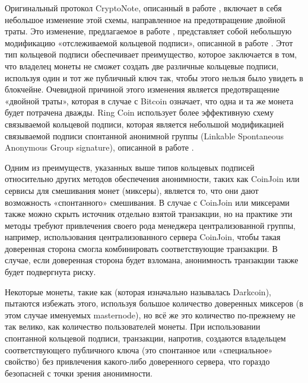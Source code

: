 \documentclass{mrl}
\theoremstyle{definition}
\numberwithin{thm}{section}
\begin{document}
Оригинальный протокол CryptoNote, описанный в работе \cite{CN}, включает в себя небольшое изменение этой схемы, направленное на предотвращение двойной траты. Это изменение, предлагаемое в работе \cite{CN}, представляет собой небольшую модификацию «отслеживаемой кольцевой подписи», описанной в работе \cite{FS}. Этот тип кольцевой подписи обеспечивает преимущество, которое заключается в том, что владелец монеты не сможет создать две различные кольцевые подписи, используя один и тот же публичный ключ так, чтобы этого нельзя было увидеть в блокчейне. Очевидной причиной этого изменения является предотвращение «двойной траты», которая в случае с Bitcoin означает, что одна и та же монета будет потрачена дважды. Ring Coin \cite{B2,B} использует более эффективную схему связываемой кольцевой подписи, которая является небольшой модификацией связываемой подписи спонтанной анонимной группы (Linkable Spontaneous Anonymous Group signature), описанной в работе \cite{LWW}.

Одним из преимуществ, указанных выше типов кольцевых подписей относительно других методов обеспечения анонимности, таких как CoinJoin \cite{GMc} или сервисы для смешивания монет (миксеры), является то, что они дают возможность «спонтанного» смешивания. В случае с CoinJoin или миксерами также можно скрыть источник отдельно взятой транзакции, но на практике эти методы требуют привлечения своего рода менеджера централизованной группы, например, использования централизованного сервера CoinJoin, чтобы такая доверенная сторона смогла комбинировать соответствующие транзакции. В случае, если доверенная сторона будет взломана, анонимность транзакции также будет подвергнута риску.

Некоторые монеты, такие как \cite{DASH} (которая изначально называлась Darkcoin), пытаются избежать этого, используя большое количество доверенных миксеров (в этом случае именуемых masternode), но всё же это количество по-прежнему не так велико, как количество пользователей монеты. При использовании спонтанной кольцевой подписи, транзакции, напротив, создаются владельцем соответствующего публичного ключа (это спонтанное или «специальное» свойство) без привлечения какого-либо доверенного сервера, что гораздо безопасней с точки зрения анонимности.
\end{document}
